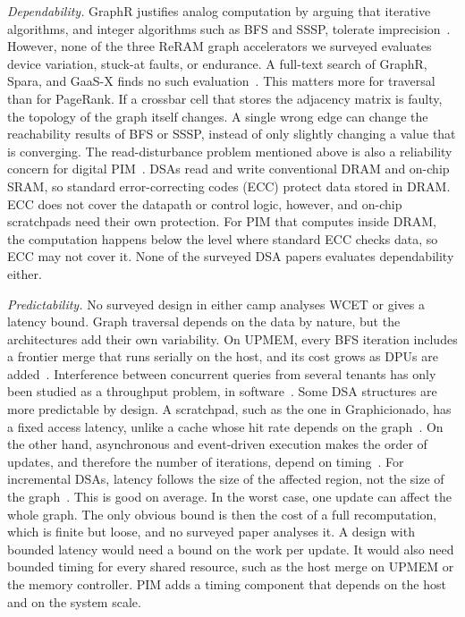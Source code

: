 \documentclass[journal,onecolumn]{IEEEtran}
\begin{document}
\emph{Dependability.} GraphR justifies analog computation by arguing that iterative algorithms, and integer algorithms such as BFS and SSSP, tolerate imprecision~\cite{song2018graphr}. However, none of the three ReRAM graph accelerators we surveyed evaluates device variation, stuck-at faults, or endurance. A full-text search of GraphR, Spara, and GaaS-X finds no such evaluation~\cite{song2018graphr,zheng2020spara,challapalle2020gaasx}. This matters more for traversal than for PageRank. If a crossbar cell that stores the adjacency matrix is faulty, the topology of the graph itself changes. A single wrong edge can change the reachability results of BFS or SSSP, instead of only slightly changing a value that is converging. The read-disturbance problem mentioned above is also a reliability concern for digital PIM~\cite{yuksel2026pid}. DSAs read and write conventional DRAM and on-chip SRAM, so standard error-correcting codes (ECC) protect data stored in DRAM. ECC does not cover the datapath or control logic, however, and on-chip scratchpads need their own protection. For PIM that computes inside DRAM, the computation happens below the level where standard ECC checks data, so ECC may not cover it. None of the surveyed DSA papers evaluates dependability either.

\emph{Predictability.} No surveyed design in either camp analyses WCET or gives a latency bound. Graph traversal depends on the data by nature, but the architectures add their own variability. On UPMEM, every BFS iteration includes a frontier merge that runs serially on the host, and its cost grows as DPUs are added~\cite{gomezluna2022prim}. Interference between concurrent queries from several tenants has only been studied as a throughput problem, in software~\cite{yin2023glign}. Some DSA structures are more predictable by design. A scratchpad, such as the one in Graphicionado, has a fixed access latency, unlike a cache whose hit rate depends on the graph~\cite{ham2016graphicionado}. On the other hand, asynchronous and event-driven execution makes the order of updates, and therefore the number of iterations, depend on timing~\cite{rahman2021jetstream,zhuo2019graphq}. For incremental DSAs, latency follows the size of the affected region, not the size of the graph~\cite{rahman2021jetstream,zhao2022tdgraph}. This is good on average. In the worst case, one update can affect the whole graph. The only obvious bound is then the cost of a full recomputation, which is finite but loose, and no surveyed paper analyses it. A design with bounded latency would need a bound on the work per update. It would also need bounded timing for every shared resource, such as the host merge on UPMEM or the memory controller. PIM adds a timing component that depends on the host and on the system scale.
\end{document}
